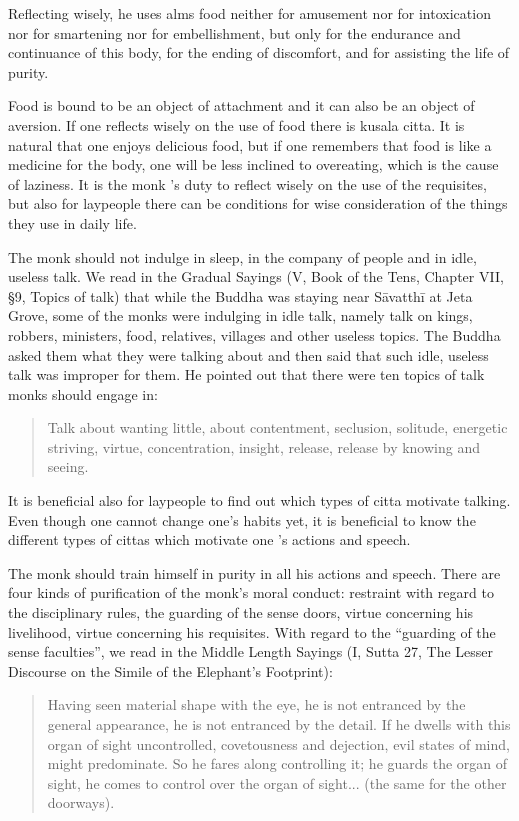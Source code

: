 \documentclass{book}
\begin{document}
Reflecting wisely, he uses alms food neither for amusement nor for
intoxication nor for smartening nor for embellishment, but only for the
endurance and continuance of this body, for the ending of discomfort,
and for assisting the life of purity.

Food is bound to be an object of attachment and it can also be an object
of aversion. If one reflects wisely on the use of food there is kusala
citta. It is natural that one enjoys delicious food, but if one
remembers that food is like a medicine for the body, one will be less
inclined to overeating, which is the cause of laziness. It is the monk
's duty to reflect wisely on the use of the requisites, but also for
laypeople there can be conditions for wise consider­ation of the things
they use in daily life.

The monk should not indulge in sleep, in the company of people and in
idle, useless talk. We read in the Gradual Sayings (V, Book of the Tens,
Chapter VII, §9, Topics of talk) that while the Buddha was staying near
Sāvatthī at Jeta Grove, some of the monks were indulging in idle talk,
namely talk on kings, robbers, ministers, food, relatives, villages and
other useless topics. The Buddha asked them what they were talking about
and then said that such idle, useless talk was improper for them. He
pointed out that there were ten topics of talk monks should engage in:

\begin{quote}
Talk about wanting little, about contentment, seclusion, solitude,
energetic striving, virtue, concentration, insight, release, release by
knowing and seeing.
\end{quote}

It is beneficial also for laypeople to find out which types of citta
motivate talking. Even though one cannot change one's habits yet, it is
beneficial to know the different types of cittas which motivate one 's
actions and speech.

The monk should train himself in purity in all his actions and speech.
There are four kinds of purification of the monk's moral conduct:
restraint with regard to the disciplinary rules, the guarding of the
sense doors, virtue concerning his livelihood, virtue concerning his
requisites. With regard to the ``guarding of the sense faculties'', we
read in the Middle Length Sayings (I, Sutta 27, The Lesser Discourse on
the Simile of the Elephant's Footprint):

\begin{quote}
Having seen material shape with the eye, he is not entranced by the 
general appearance, he is not entranced by the detail. If he dwells 
with this organ of sight uncontrolled, covetousness and dejection, evil states of mind, might predominate. So he fares along controlling it; he guards the organ of sight, he comes to control over the organ of 
sight...
(the same for the other doorways).

\end{quote}
\end{document}
